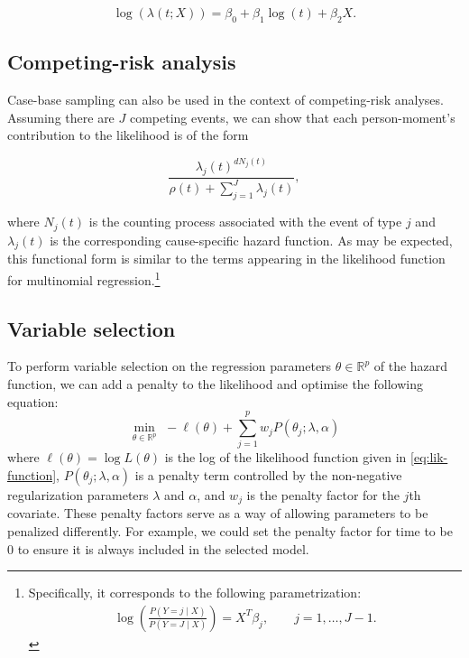 \begin{equation}
\log(\lambda(t; X)) = \beta_0 + \beta_1 \log(t) + \beta_2 X. \label{eq:weibull}
\end{equation}

\hypertarget{competing-risk-analysis}{%
\subsection{Competing-risk analysis}\label{competing-risk-analysis}}

Case-base sampling can also be used in the context of competing-risk
analyses. Assuming there are \(J\) competing events, we can show that
each person-moment's contribution to the likelihood is of the form

\[\frac{\lambda_j(t)^{dN_j(t)}}{\rho(t) + \sum_{j=1}^J\lambda_j(t)},\]

where \(N_j(t)\) is the counting process associated with the event of
type \(j\) and \(\lambda_j(t)\) is the corresponding cause-specific
hazard function. As may be expected, this functional form is similar to
the terms appearing in the likelihood function for multinomial
regression.\footnote{Specifically, it corresponds to the following parametrization: \begin{align*} \log\left(\frac{P(Y=j \mid X)}{P(Y = J \mid X)}\right) = X^T\beta_j, \qquad j = 1,\ldots, J-1.\end{align*}}

\hypertarget{variable-selection}{%
\subsection{Variable selection}\label{variable-selection}}

To perform variable selection on the regression parameters
\(\theta \in \mathbb{R}^p\) of the hazard function, we can add a penalty
to the likelihood and optimise the following equation: \begin{equation}
\min _{\theta \in \mathbb{R}^{p}}\,\,-\ell\left(\theta\right)+\sum_{j=1}^p w_j P(\theta_j;\lambda,\alpha) \label{eq:penest}
\end{equation} where \(\ell\left(\theta\right) = \log L(\theta)\) is the
log of the likelihood function given in \eqref{eq:lik-function},
\(P(\theta_j;\lambda,\alpha)\) is a penalty term controlled by the
non-negative regularization parameters \(\lambda\) and \(\alpha\), and
\(w_j\) is the penalty factor for the \(j\)th covariate. These penalty
factors serve as a way of allowing parameters to be penalized
differently. For example, we could set the penalty factor for time to be
0 to ensure it is always included in the selected model.

